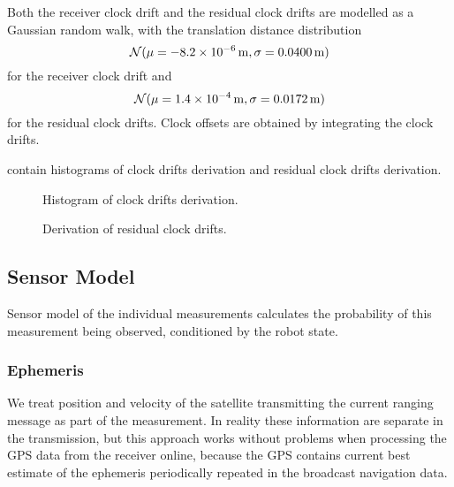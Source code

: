 Both the receiver clock drift and the residual clock drifts are modelled as a Gaussian random walk,
with the translation distance distribution
\begin{equation}
\operatorname{\mathcal{N}}(\mu = \SI{-8.2e-06}{\meter}, \sigma = \SI{0.0400}{\meter})
\end{equation}
for the receiver clock drift and 
\begin{equation}
\operatorname{\mathcal{N}}(\mu = \SI{1.4e-4}{\meter}, \sigma = \SI{0.0172}{\meter})
\end{equation}
for the residual clock drifts.
Clock offsets are obtained by integrating the clock drifts.

contain histograms of clock drifts derivation and residual
clock drifts derivation.

\begin{figure}[p]
	\centering
	\noindent{}
	\caption{Histogram of clock drifts derivation.}
	\label{fig:clock-drift-derivation}
\end{figure}

\begin{figure}[p]
	\centering
	\noindent{}
	\caption{Derivation of residual clock drifts.}
	\label{fig:residual-clock-drift-derivation}
\end{figure}


\subsection{Sensor Model}
Sensor model of the individual measurements calculates the probability of this
measurement being observed, conditioned by the robot state.

\subsubsection{Ephemeris}
We treat position and velocity of the satellite transmitting
the current ranging message as part of the measurement.
In reality these information are separate in the transmission, but
this approach works without problems when processing the GPS data from the receiver online,
because the GPS contains current best estimate of the ephemeris periodically repeated
in the broadcast navigation data.

